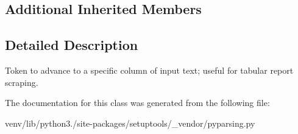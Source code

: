 \subsection*{Additional Inherited Members}


\subsection{Detailed Description}
\begin{DoxyVerb}Token to advance to a specific column of input text; useful for tabular report scraping.
\end{DoxyVerb}
 

The documentation for this class was generated from the following file\+:\begin{DoxyCompactItemize}
\item 
venv/lib/python3./site-\/packages/setuptools/\+\_\+vendor/pyparsing.\+py\end{DoxyCompactItemize}
